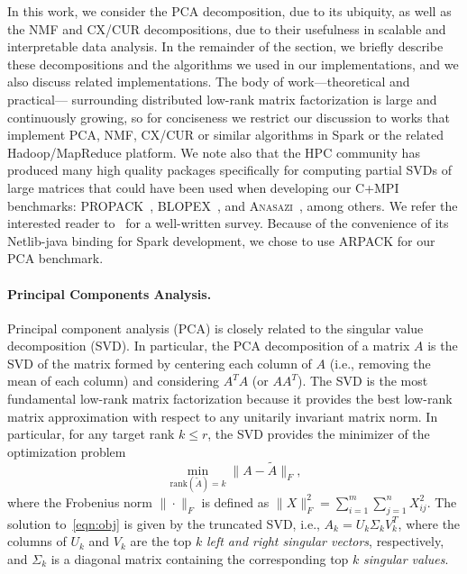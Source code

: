 In this work, we consider the PCA decomposition, due to its ubiquity, as well as the NMF and CX/CUR decompositions, due to their usefulness in scalable and interpretable data analysis. In the remainder of the section, we briefly describe these decompositions and the algorithms we used in our implementations, and we also discuss related implementations. The body of work---theoretical and practical--- surrounding distributed low-rank matrix factorization is large and continuously growing, so for conciseness we restrict our discussion to works that implement PCA, NMF, CX/CUR or similar algorithms in Spark or the related Hadoop/MapReduce platform. We note also that the HPC community has produced many high quality packages specifically for computing partial SVDs of large matrices that could have been used when  developing our C+MPI benchmarks: PROPACK~\cite{larsen1998lanczos}, BLOPEX~\cite{blopex2007}, and \textsc{Anasazi}~\cite{baker2009anasazi}, among others. We refer the interested reader to~\cite{hernandez2009survey} for a well-written survey. Because of the convenience of its Netlib-java binding for Spark development, we chose to use \textsc{ARPACK} for our PCA benchmark.

\paragraph{Principal Components Analysis.} 
Principal component analysis (PCA) is closely related to the singular value decomposition (SVD).
In particular, the PCA decomposition of a matrix $A$ is the SVD of the matrix formed by centering each column of $A$ (i.e., removing the mean of each column) and considering $A^TA$ (or $AA^T$).
The SVD is the most fundamental low-rank matrix factorization because it provides the best low-rank matrix approximation with respect to any unitarily invariant matrix norm.
In particular, for any target rank $k \leq r$, the SVD provides the minimizer of the optimization problem
\begin{equation}
 \label{eqn:obj}
  \min_{\text{rank}(\tilde A) = k} \| A - \tilde A \|_F,
\end{equation}
where the Frobenius norm $\| \cdot \|_F$ is defined as $\|X\|_F^2 =
\sum_{i=1}^m \sum_{j=1}^n X_{ij}^2 $.
The solution
to~\eqref{eqn:obj} is given by the truncated SVD, i.e., $A_k = U_k \Sigma_k
V_k^T$, where the columns of $U_k$ and $V_k$ are the top $k$ {\it left and right singular vectors}, respectively, and $\Sigma_k$ is a 
diagonal matrix containing the corresponding top $k$ {\it singular values}.


